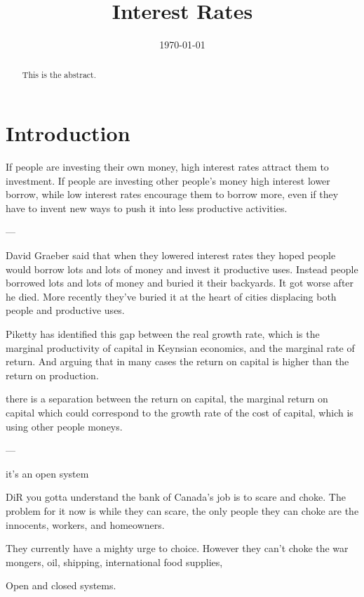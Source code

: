 \documentclass[a4paper]{article}
\title{Interest Rates}
\author{ }
\date{\today}
\theoremstyle{definition}
\theoremstyle{plain}
\begin{document}
\maketitle
\begin{abstract}
This is  the abstract.
\end{abstract}

\section{Introduction}

If people are investing their own money, high interest rates attract them to investment. If people are investing other people's money high interest lower borrow, while low interest rates encourage them to borrow more, even if they have to invent new ways to push it into less productive activities. %


---


David Graeber said that when they lowered interest rates they hoped people would borrow lots and lots of money and invest it productive uses. Instead people borrowed lots and lots of money and buried it their backyards. It got worse after he died. More recently they've buried it at the heart of cities displacing both people and productive uses.

Piketty has identified this gap between the real growth rate, which is the marginal productivity of capital in Keynsian economics, and the marginal rate of return. 
And arguing that in many cases the return on capital is higher than the return on production.


there is a separation between the return on capital, the marginal return on capital which could correspond to the growth rate of the cost of capital, which is using other people moneys.


---


it's an open system


DiR you gotta understand the bank of Canada's job is to scare and choke. The problem for it now is while they can scare, the only people they can choke are the innocents, workers, and homeowners.

They currently have a mighty urge to choice. 
 However they can't choke the war mongers, oil, shipping, international food supplies, 

Open and closed systems.

\end{document}
